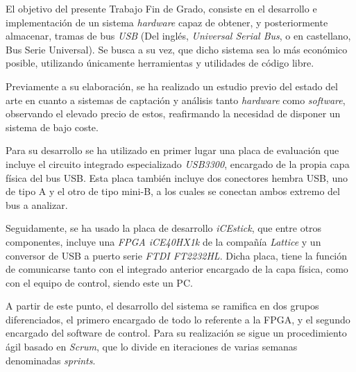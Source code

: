 \begin{resumen}

El objetivo del presente Trabajo Fin de Grado, consiste en el desarrollo e implementación de un sistema \emph{hardware} capaz de obtener, y posteriormente almacenar, tramas de bus \emph{USB} (Del inglés, \emph{Universal Serial Bus}, o en castellano, Bus Serie Universal). Se busca a su vez, que dicho sistema sea lo más económico posible, utilizando únicamente herramientas y utilidades de código libre.

Previamente a su elaboración, se ha realizado un estudio previo del estado del arte en cuanto a sistemas de captación y análisis tanto \emph{hardware} como \emph{software}, observando el elevado precio de estos, reafirmando la necesidad de disponer un sistema de bajo coste.

Para su desarrollo se ha utilizado en primer lugar una placa de evaluación que incluye el circuito integrado especializado \emph{USB3300}, encargado de la propia capa física del bus USB. Esta placa también incluye dos conectores hembra USB, uno de tipo A y el otro de tipo mini-B, a los cuales se conectan ambos extremo del bus a analizar.

Seguidamente, se ha usado la placa de desarrollo \emph{iCEstick}, que entre otros componentes, incluye una \emph{FPGA iCE40HX1k} de la compañía \emph{Lattice} y un conversor de USB a puerto serie \emph{FTDI FT2232HL}. Dicha placa, tiene la función de comunicarse tanto con el integrado anterior encargado de la capa física, como con el equipo de control, siendo este un PC.

A partir de este punto, el desarrollo del sistema se ramifica en dos grupos diferenciados, el primero encargado de todo lo referente a la FPGA, y el segundo encargado del software de control. Para su realización se sigue un procedimiento ágil basado en \emph{Scrum}, que lo divide en iteraciones de varias semanas denominadas \emph{sprints}.


\end{resumen}
